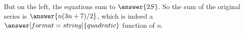 \documentclass[nooutcomes]{ximera}
\begin{document}
\begin{problem}
\begin{problem}
\begin{problem}
\begin{problem}
But on the left, the equations sum to $\answer{2S}$.  So the sum of the original series is 
$\answer{n(3n+7)/2}$, which is indeed a $\answer[format=string]{quadratic}$ function of $n$.  
\end{problem}

\end{problem}


\end{problem}


\end{problem}
\end{document}

